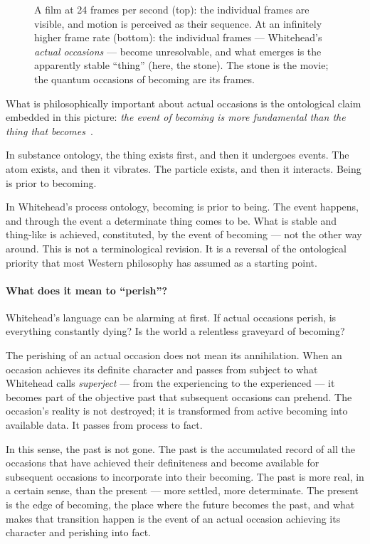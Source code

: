 \begin{figure}[htbp]
  \centering
  \resizebox{\linewidth}{!}{}
  \caption[The stone is the movie, not the frames]{A film at 24 frames per second (top): the individual frames are visible, and motion is perceived as their sequence. At an infinitely higher frame rate (bottom): the individual frames --- Whitehead's \emph{actual occasions} --- become unresolvable, and what emerges is the apparently stable ``thing'' (here, the stone). The stone is the movie; the quantum occasions of becoming are its frames.}
  \label{fig:film-strip}
\end{figure}

What is philosophically important about actual occasions is the ontological
claim embedded in this picture: \emph{the event of becoming is more
fundamental than the thing that becomes}~\citeyearpar{Whitehead1929}.

In substance ontology, the thing exists first, and then it undergoes events.
The atom exists, and then it vibrates.
The particle exists, and then it interacts.
Being is prior to becoming.

In Whitehead's process ontology, becoming is prior to being.
The event happens, and through the event a determinate thing comes to be.
What is stable and thing-like is achieved, constituted, by the event of
becoming --- not the other way around.
This is not a terminological revision.
It is a reversal of the ontological priority that most Western philosophy
has assumed as a starting point.

\paragraph{What does it mean to ``perish''?}

Whitehead's language can be alarming at first.
If actual occasions perish, is everything constantly dying?
Is the world a relentless graveyard of becoming?

The perishing of an actual occasion does not mean its annihilation.
When an occasion achieves its definite character and passes from subject
to what Whitehead calls \emph{superject} --- from the experiencing to the
experienced --- it becomes part of the objective past that subsequent
occasions can prehend.
The occasion's reality is not destroyed; it is transformed from active
becoming into available data.
It passes from process to fact.

In this sense, the past is not gone.
The past is the accumulated record of all the occasions that have achieved
their definiteness and become available for subsequent occasions to
incorporate into their becoming.
The past is more real, in a certain sense, than the present --- more settled,
more determinate.
The present is the edge of becoming, the place where the future becomes
the past, and what makes that transition happen is the event of an actual
occasion achieving its character and perishing into fact.

